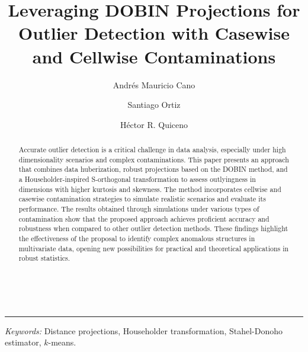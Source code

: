 \documentclass[12pt]{article}
\begin{document}
\date{}
%

\def\spacingset#1{\renewcommand{\baselinestretch}%
{#1}\small\normalsize} \spacingset{1}

\title{\bf Leveraging DOBIN Projections for Outlier Detection with Casewise and Cellwise Contaminations}\\

\renewcommand\Authfont{\normalsize} %
\renewcommand\Affilfont{\small\itshape} %

\author[1]{Andrés Mauricio Cano}
\author[2]{Santiago Ortiz}
\author[3]{Héctor R. Quiceno}



\date{} %

\maketitle

\hrule %

\begin{abstract}

Accurate outlier detection is a critical challenge in data analysis, especially under high dimensionality scenarios and complex contaminations. This paper presents an approach that combines data huberization, robust projections based on the DOBIN method, and a Householder-inspired S-orthogonal transformation to assess outlyingness in dimensions with higher kurtosis and skewness. The method incorporates cellwise and casewise contamination strategies to simulate realistic scenarios and evaluate its performance. The results obtained through simulations under various types of contamination show that the proposed approach achieves proficient accuracy and robustness when compared to other outlier detection methods. These findings highlight the effectiveness of the proposal to identify complex anomalous structures in multivariate data, opening new possibilities for practical and theoretical applications in robust statistics.


\end{abstract}

\textit{Keywords:} Distance projections, Householder transformation, Stahel-Donoho estimator, $k$-means.
\end{document}
